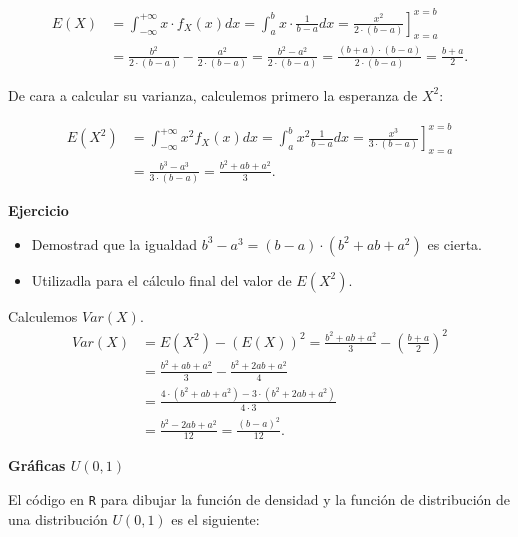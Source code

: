 \documentclass[]{book}
\begin{document}
\[
\begin{array}{rl}
E(X)&=\displaystyle\int_{-\infty}^{+\infty} x\cdot f_X(x) dx =\int_{a}^{b} x \cdot \frac{1}{b-a} dx =
\left.\frac{x^2}{2\cdot (b-a)}\right]_{x=a}^{x=b}\\
&=\displaystyle \frac{b^2}{2\cdot (b-a)}-\frac{a^2}{2\cdot (b-a)}=
\frac{b^2-a^2}{2\cdot (b-a)}=\frac{(b+a)\cdot (b-a)}{2\cdot (b-a)}=
\frac{b+a}{2}.
\end{array}
\]

De cara a calcular su varianza, calculemos primero la esperanza de \(X^2\):

\[
\begin{array}{rl}
E(X^2)&=\displaystyle\int_{-\infty}^{+\infty} x^2 f_X(x) dx=\int_{a}^{b} x^2 \frac1{b-a}
dx =\left.\frac{x^3}{3\cdot (b-a)}\right]_{x=a}^{x=b} \\
&=\displaystyle\frac{b^3-a^3}{3\cdot (b-a)}=\frac{b^2+ab+a^2}{3}.
\end{array}
\]

\textbf{Ejercicio}

\begin{itemize}
\item
  Demostrad que la igualdad \(b^3-a^3=(b-a)\cdot (b^2+ab+a^2)\) es cierta.
\item
  Utilizadla para el cálculo final del valor de \(E(X^2)\).
\end{itemize}

Calculemos \(Var(X)\).
\[
\begin{array}{rl}
Var(X)&=\displaystyle E(X^2)-(E(X))^2=\frac{b^2+ab+a^2}3-\left(\frac{b+a}2\right)^2\\&=\displaystyle
\frac{b^2+ab+a^2}{3}-\frac{b^2+2ab+a^2}{4}\\
&=\displaystyle
\frac{4\cdot (b^2+ab+a^2)-3\cdot (b^2+2ab+a^2)}{4\cdot 3}
\\
&=\displaystyle
\frac{b^2-2ab+a^2}{12}=
\frac{(b-a)^2}{12}.
\end{array}
\]

\textbf{Gráficas \(U(0,1)\)}

El código en \texttt{R} para dibujar la función de densidad y la función de distribución de una distribución \(U(0,1)\) es el siguiente:
\end{document}
